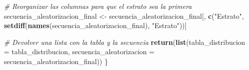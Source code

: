 \documentclass[
]{article}
\newenvironment{Shaded}{\begin{snugshade}}{\end{snugshade}}
\newcommand{\AttributeTok}[1]{\textcolor[rgb]{0.13,0.29,0.53}{#1}}
\newcommand{\CommentTok}[1]{\textcolor[rgb]{0.56,0.35,0.01}{\textit{#1}}}
\newcommand{\FunctionTok}[1]{\textcolor[rgb]{0.13,0.29,0.53}{\textbf{#1}}}
\newcommand{\NormalTok}[1]{#1}
\newcommand{\OtherTok}[1]{\textcolor[rgb]{0.56,0.35,0.01}{#1}}
\newcommand{\StringTok}[1]{\textcolor[rgb]{0.31,0.60,0.02}{#1}}
\begin{document}
\begin{Shaded}
\begin{Highlighting}[]
  \CommentTok{\# Reorganizar las columnas para que el estrato sea la primera}
\NormalTok{  secuencia\_aleatorizacion\_final }\OtherTok{\textless{}{-}}\NormalTok{ secuencia\_aleatorizacion\_final[, }\FunctionTok{c}\NormalTok{(}\StringTok{"Estrato"}\NormalTok{, }\FunctionTok{setdiff}\NormalTok{(}\FunctionTok{names}\NormalTok{(secuencia\_aleatorizacion\_final), }\StringTok{"Estrato"}\NormalTok{))]}


  \CommentTok{\# Devolver una lista con la tabla y la secuencia}
  \FunctionTok{return}\NormalTok{(}\FunctionTok{list}\NormalTok{(}\AttributeTok{tabla\_distribucion =}\NormalTok{ tabla\_distribucion, }\AttributeTok{secuencia\_aleatorizacion =}\NormalTok{ secuencia\_aleatorizacion\_final))}
\NormalTok{\}}
\end{Highlighting}
\end{Shaded}
\end{document}
